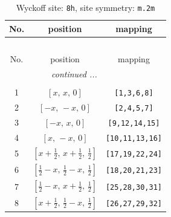 \documentclass[fleqn,8pt]{jsarticle}
\begin{document}
\begin{longtable}{ccc}
\caption{Wyckoff site: {\tt 8h}, site symmetry: {\tt m.2m}}
 \\
 \hline \hline
No. & position & mapping \\ \hline \endfirsthead

\multicolumn{2}{l}{\tablename\ \thetable{}} \\
 \hline \hline
No. & position & mapping \\ \hline \endhead

 \hline \hline
\multicolumn{2}{r}{\footnotesize\it continued ...} \\ \endfoot

 \hline \hline
\multicolumn{2}{r}{} \\ \endlastfoot

1 & $\left[ x,\, x,\, 0 \right]$ & {\tt [1,3,6,8]} \\ \hline
2 & $\left[ - x,\, - x,\, 0 \right]$ & {\tt [2,4,5,7]} \\ \hline
3 & $\left[ - x,\, x,\, 0 \right]$ & {\tt [9,12,14,15]} \\ \hline
4 & $\left[ x,\, - x,\, 0 \right]$ & {\tt [10,11,13,16]} \\ \hline
5 & $\left[ x + \frac{1}{2},\, x + \frac{1}{2},\, \frac{1}{2} \right]$ & {\tt [17,19,22,24]} \\ \hline
6 & $\left[ \frac{1}{2} - x,\, \frac{1}{2} - x,\, \frac{1}{2} \right]$ & {\tt [18,20,21,23]} \\ \hline
7 & $\left[ \frac{1}{2} - x,\, x + \frac{1}{2},\, \frac{1}{2} \right]$ & {\tt [25,28,30,31]} \\ \hline
8 & $\left[ x + \frac{1}{2},\, \frac{1}{2} - x,\, \frac{1}{2} \right]$ & {\tt [26,27,29,32]} \\
\end{longtable}
\renewcommand{\arraystretch}{1.2}
\end{document}
